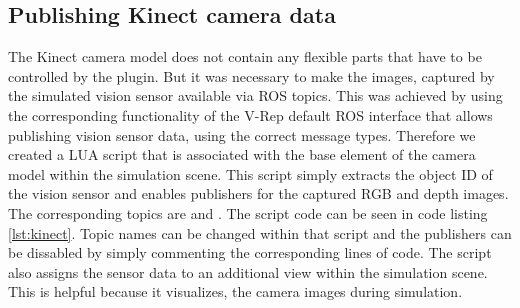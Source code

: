 \subsection{Publishing Kinect camera data}

The Kinect camera model does not contain any flexible parts that have to be controlled by the plugin. But it was necessary to make the images, captured by the simulated vision sensor available via ROS topics. This was achieved by using the corresponding functionality of the V-Rep default ROS interface that allows publishing vision sensor data, using the correct message types. Therefore we created a LUA script that is associated with the base element of the camera model within the simulation scene. This script simply extracts the object ID of the vision sensor and enables publishers for the captured RGB and depth images. The corresponding topics are  and . The script code can be seen in code listing \ref{lst:kinect}. Topic names can be changed within that script and the publishers can be dissabled by simply commenting the corresponding lines of code. The script also assigns the sensor data to an additional view within the simulation scene. This is helpful because it visualizes, the camera images during simulation.

\lstset{style=customc}
\begin{minipage}{\linewidth}

\end{minipage} \\